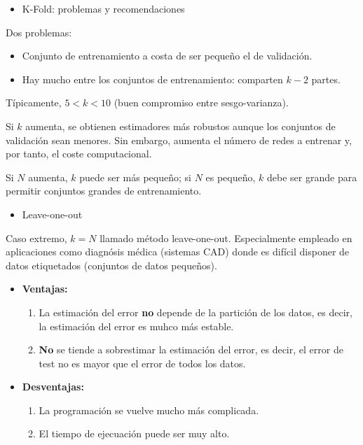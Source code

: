 \begin{itemize}[label=\color{red}\textbullet, leftmargin=*]
	\item \color{lightblue}K-Fold: problemas y recomendaciones
\end{itemize}
Dos problemas:
\begin{itemize}
	\item Conjunto de entrenamiento  a costa de ser pequeño el de validación.
	\item Hay mucho  entre los conjuntos de entrenamiento: comparten $k-2$ partes.
\end{itemize}
Típicamente, $5<k<10$ (buen compromiso entre sesgo-varianza).

Si $k$ aumenta, se obtienen estimadores más robustos aunque los conjuntos de validación sean menores. Sin embargo, aumenta el número de redes a entrenar y, por tanto, el coste computacional.

Si $N$ aumenta, $k$ puede ser más pequeño; si $N$ es pequeño, $k$ debe ser grande para permitir conjuntos grandes de entrenamiento.
\begin{itemize}[label=\color{red}\textbullet, leftmargin=*]
	\item \color{lightblue}Leave-one-out
\end{itemize}
Caso extremo, $k=N$ llamado método leave-one-out. Especialmente empleado en aplicaciones como diagnósis médica (sistemas CAD) donde es difícil disponer de datos etiquetados (conjuntos de datos pequeños).
\begin{itemize}
	\item \textbf{Ventajas:}
	\begin{enumerate}[label=\arabic*)]
		\item La estimación del error \textbf{no} depende de la partición de los datos, es decir, la estimación del error es muhco más estable.
		\item \textbf{No} se tiende a sobrestimar la estimación del error, es decir, el error de test no es mayor que el error de todos los datos.
	\end{enumerate}
	\item \textbf{Desventajas:}
	\begin{enumerate}[label=\arabic*)]
		\item La programación se vuelve mucho más complicada.
		\item El tiempo de ejecuación puede ser muy alto.
	\end{enumerate}
\end{itemize}